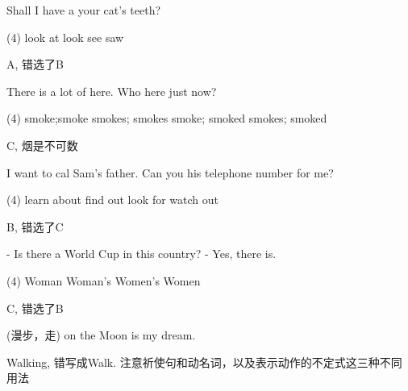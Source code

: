 \begin{question}[tags={xiaoxuect}]
Shall I have a \blank[width=1.0cm]{} your cat's teeth?
  \begin{tasks}(4)
    \task look at
    \task look
    \task see
    \task saw
  \end{tasks}

\end{question}
\begin{solution}
A, 错选了B
\end{solution}


\begin{question}[tags={xiaoxuect}]
There is a lot of \blank[width=1.0cm]{} here. Who \blank[width=1cm]{} here just now?
  \begin{tasks}(4)
    \task smoke;smoke
    \task smokes; smokes
    \task smoke; smoked
    \task smokes; smoked
  \end{tasks}

\end{question}
\begin{solution}
C, 烟是不可数
\end{solution}


\begin{question}[tags={xiaoxuect}]
I want to cal Sam's father. Can you \blank[width=1.0cm]{} his telephone number for me?
  \begin{tasks}(4)
    \task learn about
    \task find out
    \task look for
    \task watch out
  \end{tasks}

\end{question}
\begin{solution}
B, 错选了C
\end{solution}



\begin{question}[tags={xiaoxuect}]
- Is there a \blank[width=1.0cm]{} World Cup in this country? - Yes, there is.
  \begin{tasks}(4)
    \task Woman
    \task Woman's
    \task Women's
    \task Women
  \end{tasks}

\end{question}
\begin{solution}
C, 错选了B
\end{solution}


\begin{question}[tags={xiaoxuect}]
\blank*[width=1.0cm]{}(漫步，走) on the Moon is my dream.
\end{question}
\begin{solution}
Walking, 错写成Walk. 注意祈使句和动名词，以及表示动作的不定式这三种不同用法
\end{solution}




